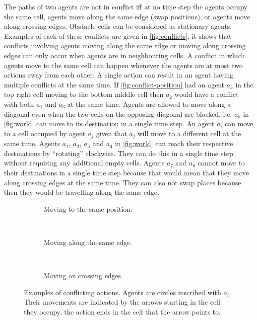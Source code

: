 The paths of two agents are not in conflict iff at no time step the agents
occupy the same cell, agents move along the same edge (swap positions), or
agents move along crossing edges. Obstacle cells can be considered as
stationary agents. Examples of each of these conflicts are given
in \autoref{fig:conflicts}, it shows that conflicts involving agents moving
along the same edge or moving along crossing edges can only occur when agents
are in neighbouring cells. A conflict in which agents move to the same cell can
happen whenever the agents are at most two actions away from each other. A
single action can result in an agent having multiple conflicts at the same
time. If \autoref{fig:conflict-position} had an agent $a_3$ in the top right
cell moving to the bottom middle cell then $a_2$ would have a conflict with
both $a_1$ and $a_3$ at the same time.
Agents are allowed to move along a diagonal even when the two cells on the
opposing diagonal are blocked, i.e. $a_5$ in \autoref{fig:world} can move to its
destination in a single time step. An agent $a_i$ can move to a cell occupied by
agent $a_j$ given that $a_j$ will move to a different cell at the same time.
Agents $a_1$, $a_2$, $a_3$ and $a_4$ in \autoref{fig:world} can reach their
respective destinations by ``rotating'' clockwise. They can do this in a single
time step without requiring any additional empty cells. Agents $a_7$ and $a_8$
cannot move to their
destinations in a single time step because that would mean that they move along
crossing edges at the same time. They can also not swap places because then
they would be travelling along the same edge.

\begin{figure}[t]
	\centering
	\begin{subfigure}[b]{.3\textwidth}
		\centering
	    \def\svgscale{.7}
		
		\caption{Moving to the same position.}
		\label{fig:conflict-position}
	\end{subfigure}
	~
	\begin{subfigure}[b]{.3\textwidth}
		\centering
	    \def\svgscale{.7}
		
		\caption{Moving along the same edge.}
		\label{fig:conflict-same}
	\end{subfigure}
	~
	\begin{subfigure}[b]{.3\textwidth}
		\centering
  \def\svgscale{.7}
		
		\caption{Moving on crossing edges.}
		\label{fig:conflict-crossing}
	\end{subfigure}
	\caption{Examples of conflicting actions. Agents are circles inscribed with
	$a_i$. Their movements are indicated by the arrows starting in the cell
	they occupy, the action ends in the cell that the arrow points to.}
	\label{fig:conflicts}
\end{figure}